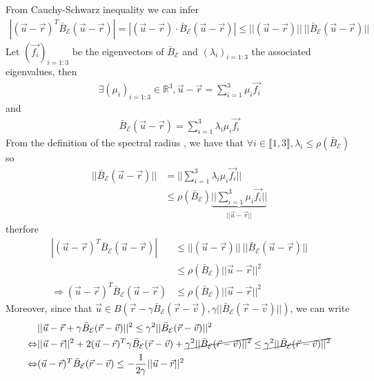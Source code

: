 \documentclass[class=report, float=false, crop=false]{standalone}
\begin{document}
From Cauchy-Schwarz inequality we can infer
\begin{align*}
|(\vec{u} - \vec{r})^T\bar{B}_{\mathcal{E}}(\vec{u} - \vec{r})| = |(\vec{u} - \vec{r})\cdot \bar{B}_{\mathcal{E}}(\vec{u} - \vec{r})| \leq ||(\vec{u} - \vec{r})||~||\bar{B}_{\mathcal{E}}(\vec{u} - \vec{r})||
\end{align*}
Let $(\vec{f_i})_{i=1:3}$ be the eigenvectors of $\bar{B}_{\mathcal{E}}$ and $(\lambda_i)_{i=1:3}$ the associated eigenvalues, then
\begin{align*}
\exists (\mu_i)_{i=1:3} \in \mathbb{R}^3, \vec{u} - \vec{r} = \sum_{i=1}^3 \mu_i \vec{f_i}
\end{align*}
and
\begin{align*}
\bar{B}_{\mathcal{E}}(\vec{u} - \vec{r}) = \sum_{i=1}^3 \lambda_i \mu_i \vec{f_i}
\end{align*}
From the definition of the spectral radius \cite{wiki:spectral}, we have that $\forall i \in \llbracket1,3\rrbracket, \lambda_i \leq \rho(\bar{B}_{\mathcal{E}})$ so
\begin{align*}
||\bar{B}_{\mathcal{E}}(\vec{u} - \vec{r})|| &= ||\sum_{i=1}^3 \lambda_i \mu_i \vec{f_i}||\\
&\leq \rho(\bar{B}_{\mathcal{E}})\underbrace{||\sum_{i=1}^3 \mu_i \vec{f_i}||}_{||\vec{u} - \vec{r}||}
\end{align*}
therfore
\begin{align*}
|(\vec{u} - \vec{r})^T\bar{B}_{\mathcal{E}}(\vec{u} - \vec{r})| &\leq ||(\vec{u} - \vec{r})||~||\bar{B}_{\mathcal{E}}(\vec{u} - \vec{r})||\\
&\leq \rho(\bar{B}_{\mathcal{E}}) ||\vec{u} - \vec{r}||^2\\
\Rightarrow (\vec{u} - \vec{r})^T\bar{B}_{\mathcal{E}}(\vec{u} - \vec{r}) &\leq \rho(\bar{B}_{\mathcal{E}}) ||\vec{u} - \vec{r}||^2
\end{align*}
Moreover, since that $\vec{u} \in B(\vec{r} - \gamma \bar{B}_{\mathcal{E}}(\vec{r} - \vec{v}),\gamma ||\bar{B}_{\mathcal{E}}(\vec{r} - \vec{v})||)$, we can write
\begin{align*}
&||\vec{u} - \vec{r} + \gamma \bar{B}_{\mathcal{E}}(\vec{r} - \vec{v})||^2 \leq \gamma^2 ||\bar{B}_{\mathcal{E}}(\vec{r} - \vec{v})||^2\\
\Leftrightarrow &||\vec{u} - \vec{r}||^2 + 2(\vec{u} - \vec{r})^T\gamma \bar{B}_{\mathcal{E}}(\vec{r} - \vec{v}) + \cancel{\gamma^2 ||\bar{B}_{\mathcal{E}}(\vec{r} - \vec{v})||^2} \leq \cancel{\gamma^2 ||\bar{B}_{\mathcal{E}}(\vec{r} - \vec{v})||^2}\\
\Leftrightarrow &(\vec{u} - \vec{r})^T \bar{B}_{\mathcal{E}}(\vec{r} - \vec{v}) \leq -\frac{1}{2\gamma} ||\vec{u} - \vec{r}||^2
\end{align*}
\end{document}
